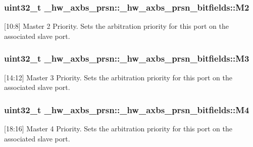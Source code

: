 \subsubsection[{\texorpdfstring{M2}{M2}}]{\setlength{\rightskip}{0pt plus 5cm}uint32\+\_\+t \+\_\+hw\+\_\+axbs\+\_\+prsn\+::\+\_\+hw\+\_\+axbs\+\_\+prsn\+\_\+bitfields\+::\+M2}\hypertarget{struct__hw__axbs__prsn_1_1__hw__axbs__prsn__bitfields_a21c44745dc735b5b079d6bb168398080}{}\label{struct__hw__axbs__prsn_1_1__hw__axbs__prsn__bitfields_a21c44745dc735b5b079d6bb168398080}
\mbox{[}10\+:8\mbox{]} Master 2 Priority. Sets the arbitration priority for this port on the associated slave port. 
\subsubsection[{\texorpdfstring{M3}{M3}}]{\setlength{\rightskip}{0pt plus 5cm}uint32\+\_\+t \+\_\+hw\+\_\+axbs\+\_\+prsn\+::\+\_\+hw\+\_\+axbs\+\_\+prsn\+\_\+bitfields\+::\+M3}\hypertarget{struct__hw__axbs__prsn_1_1__hw__axbs__prsn__bitfields_aa0d220267ce250da7020adcbb4f59e5b}{}\label{struct__hw__axbs__prsn_1_1__hw__axbs__prsn__bitfields_aa0d220267ce250da7020adcbb4f59e5b}
\mbox{[}14\+:12\mbox{]} Master 3 Priority. Sets the arbitration priority for this port on the associated slave port. 
\subsubsection[{\texorpdfstring{M4}{M4}}]{\setlength{\rightskip}{0pt plus 5cm}uint32\+\_\+t \+\_\+hw\+\_\+axbs\+\_\+prsn\+::\+\_\+hw\+\_\+axbs\+\_\+prsn\+\_\+bitfields\+::\+M4}\hypertarget{struct__hw__axbs__prsn_1_1__hw__axbs__prsn__bitfields_aa218f4c812f2a15692881d6a0ee4a0b9}{}\label{struct__hw__axbs__prsn_1_1__hw__axbs__prsn__bitfields_aa218f4c812f2a15692881d6a0ee4a0b9}
\mbox{[}18\+:16\mbox{]} Master 4 Priority. Sets the arbitration priority for this port on the associated slave port. 
